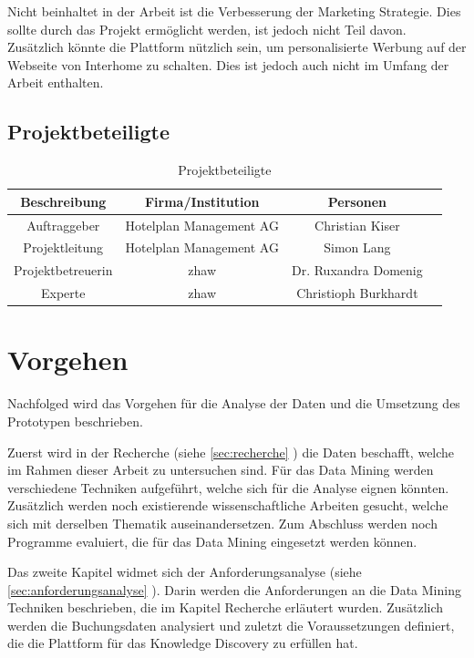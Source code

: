 Nicht beinhaltet in der Arbeit ist die Verbesserung der Marketing Strategie. Dies sollte durch das Projekt ermöglicht werden, ist jedoch nicht Teil davon. Zusätzlich könnte die Plattform nützlich sein, um personalisierte Werbung auf der Webseite von Interhome zu schalten. Dies ist jedoch auch nicht im Umfang der Arbeit enthalten.

\subsection{Projektbeteiligte}
\begin{table}[H] 
	\caption{Projektbeteiligte}
	\centering
	
	\begin{tabular}{ | c | c | c | c |} 
		\hline 
		\rowcolor{tableheadcolor}
		\bfseries Beschreibung & 
		\bfseries Firma/Institution & 
		\bfseries Personen \\ \hline 
		Auftraggeber & Hotelplan Management AG & Christian Kiser \\ \hline 
		Projektleitung & Hotelplan Management AG & Simon Lang\\ \hline 
		Projektbetreuerin &  \gls{zhaw} & Dr. Ruxandra Domenig \\ \hline 
		Experte & \gls{zhaw} & Christioph Burkhardt \\ \hline 
	\end{tabular} 
\end{table}

\section{Vorgehen}
\label{sec:einletung:vorgehen}
Nachfolged wird das Vorgehen für die Analyse der Daten und die Umsetzung des Prototypen beschrieben.

Zuerst wird in der Recherche (siehe \cref{sec:recherche} ) die Daten beschafft, welche im Rahmen dieser Arbeit zu untersuchen sind. Für das Data Mining werden verschiedene Techniken aufgeführt, welche sich für die Analyse eignen könnten. Zusätzlich werden noch existierende wissenschaftliche Arbeiten gesucht, welche sich mit derselben Thematik auseinandersetzen. Zum Abschluss werden noch Programme evaluiert, die für das Data Mining eingesetzt werden können.

Das zweite Kapitel widmet sich der Anforderungsanalyse (siehe \cref{sec:anforderungsanalyse} ). Darin werden die Anforderungen an die Data Mining Techniken beschrieben, die im Kapitel Recherche erläutert wurden. Zusätzlich werden die Buchungsdaten analysiert und zuletzt die Voraussetzungen definiert, die die Plattform für das Knowledge Discovery zu erfüllen hat.

